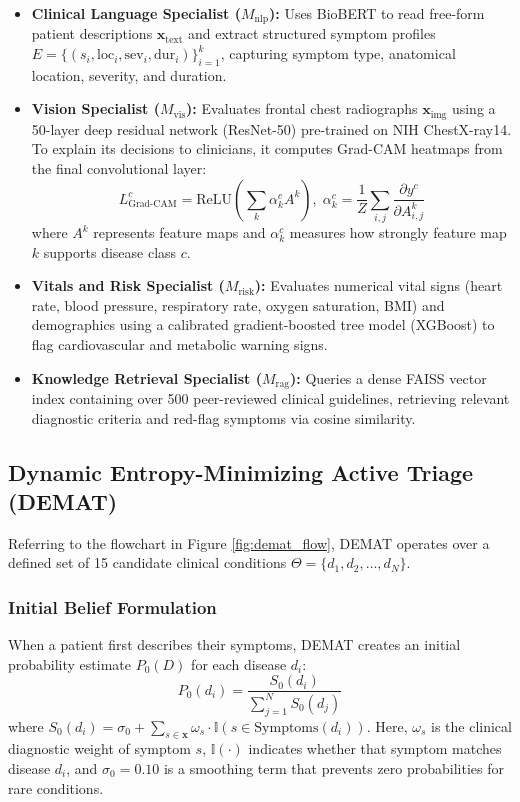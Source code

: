 \documentclass[10pt,twocolumn]{article}
\begin{document}
\begin{itemize}
    \item \textbf{Clinical Language Specialist ($M_{\text{nlp}}$):} Uses BioBERT \cite{lee2020biobert} to read free-form patient descriptions $\mathbf{x}_{\text{text}}$ and extract structured symptom profiles $E = \{(s_i, \text{loc}_i, \text{sev}_i, \text{dur}_i)\}_{i=1}^k$, capturing symptom type, anatomical location, severity, and duration.
    \item \textbf{Vision Specialist ($M_{\text{vis}}$):} Evaluates frontal chest radiographs $\mathbf{x}_{\text{img}}$ using a 50-layer deep residual network (ResNet-50) \cite{he2016deep} pre-trained on NIH ChestX-ray14. To explain its decisions to clinicians, it computes Grad-CAM heatmaps \cite{selvaraju2017grad} from the final convolutional layer:
    \begin{equation}
    L_{\text{Grad-CAM}}^c = \text{ReLU}\left(\sum_k \alpha_k^c A^k\right), \; \alpha_k^c = \frac{1}{Z}\sum_{i,j} \frac{\partial y^c}{\partial A_{i,j}^k}
    \end{equation}
    where $A^k$ represents feature maps and $\alpha_k^c$ measures how strongly feature map $k$ supports disease class $c$.
    \item \textbf{Vitals and Risk Specialist ($M_{\text{risk}}$):} Evaluates numerical vital signs (heart rate, blood pressure, respiratory rate, oxygen saturation, BMI) and demographics using a calibrated gradient-boosted tree model (XGBoost) \cite{chen2016xgboost} to flag cardiovascular and metabolic warning signs.
    \item \textbf{Knowledge Retrieval Specialist ($M_{\text{rag}}$):} Queries a dense FAISS vector index \cite{johnson2019billion} containing over 500 peer-reviewed clinical guidelines, retrieving relevant diagnostic criteria and red-flag symptoms via cosine similarity.
\end{itemize}

\subsection{Dynamic Entropy-Minimizing Active Triage (DEMAT)}
Referring to the flowchart in Figure \ref{fig:demat_flow}, DEMAT operates over a defined set of 15 candidate clinical conditions $\Theta = \{d_1, d_2, \dots, d_N\}$.

\subsubsection{Initial Belief Formulation}
When a patient first describes their symptoms, DEMAT creates an initial probability estimate $P_0(D)$ for each disease $d_i$:
\begin{equation}
P_0(d_i) = \frac{S_0(d_i)}{\sum_{j=1}^N S_0(d_j)}
\end{equation}
where $S_0(d_i) = \sigma_0 + \sum_{s \in \mathbf{x}} \omega_s \cdot \mathbb{I}(s \in \text{Symptoms}(d_i))$. Here, $\omega_s$ is the clinical diagnostic weight of symptom $s$, $\mathbb{I}(\cdot)$ indicates whether that symptom matches disease $d_i$, and $\sigma_0 = 0.10$ is a smoothing term that prevents zero probabilities for rare conditions.
\end{document}
